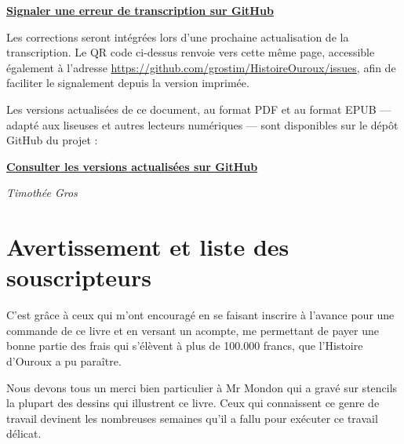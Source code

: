 \documentclass[11pt,a4paper]{report}
\begin{document}
\begin{center}
    \href{https://github.com/grostim/HistoireOuroux/issues}{\textbf{Signaler une erreur de transcription sur GitHub}}

    \vspace{0.5cm}
\end{center}

Les corrections seront intégrées lors d'une prochaine actualisation de la transcription. Le QR code ci-dessus renvoie vers cette même page, accessible également à l'adresse \url{https://github.com/grostim/HistoireOuroux/issues}, afin de faciliter le signalement depuis la version imprimée.

Les versions actualisées de ce document, au format PDF et au format EPUB --- adapté aux liseuses et autres lecteurs numériques --- sont disponibles sur le dépôt GitHub du projet :

\begin{center}
    \href{https://github.com/grostim/HistoireOuroux/releases/latest}{\textbf{Consulter les versions actualisées sur GitHub}}
\end{center}

\vfill

\begin{flushright}
    \textit{Timothée Gros}
\end{flushright}

\newpage
\pagestyle{fancy}

\chapter{Avertissement et liste des souscripteurs}

C'est grâce à ceux qui m'ont encouragé en se faisant inscrire à l'avance pour
une commande de ce livre et en versant un acompte, me permettant de payer une
bonne partie des frais qui s'élèvent à plus de 100.000 francs, que l'Histoire
d'Ouroux a pu paraître.

Nous devons tous un merci bien particulier à Mr Mondon qui a gravé sur stencils
la plupart des dessins qui illustrent ce livre. Ceux qui connaissent ce genre de
travail devinent les nombreuses semaines qu'il a fallu pour exécuter ce travail
délicat.
\end{document}
